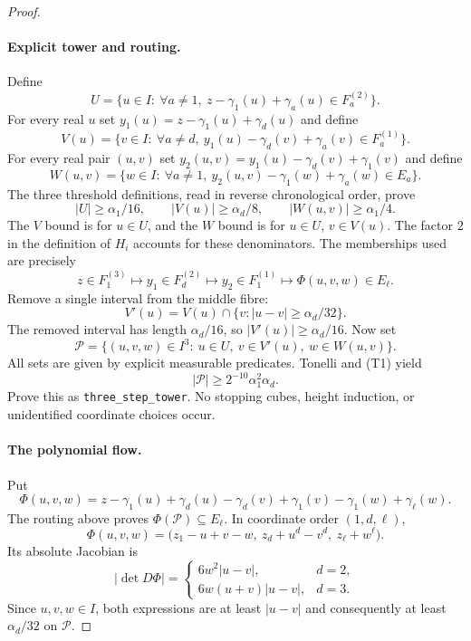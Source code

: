 \documentclass[11pt]{article}
\begin{document}
\begin{proof}
\paragraph{Explicit tower and routing.}
Define
\[
 U=\{u\in I:\ \forall a\ne1,\
       z-\gamma_1(u)+\gamma_a(u)\in F^{(2)}_a\}.
\]
For every real $u$ set $y_1(u)=z-\gamma_1(u)+\gamma_d(u)$ and define
\[
 V(u)=\{v\in I:\ \forall a\ne d,\
       y_1(u)-\gamma_d(v)+\gamma_a(v)\in F^{(1)}_a\}.
\]
For every real pair $(u,v)$ set $y_2(u,v)=y_1(u)-\gamma_d(v)+\gamma_1(v)$ and define
\[
 W(u,v)=\{w\in I:\ \forall a\ne1,\
       y_2(u,v)-\gamma_1(w)+\gamma_a(w)\in E_a\}.
\]
The three threshold definitions, read in reverse chronological order,
prove
\[
 |U|\geq\alpha_1/16,\qquad
 |V(u)|\geq\alpha_d/8,\qquad
 |W(u,v)|\geq\alpha_1/4.                            \tag{T1}
\]
The $V$ bound is for $u\in U$, and the $W$ bound is for $u\in U$, $v\in V(u)$. The factor $2$ in the definition of $H_i$ accounts for these denominators.
The memberships used are precisely
\[
 z\in F^{(3)}_1
 \longmapsto y_1\in F^{(2)}_d
 \longmapsto y_2\in F^{(1)}_1
 \longmapsto \Phi(u,v,w)\in E_\ell.
\]
Remove a single interval from the middle fibre:
\[
 V'(u)=V(u)\cap\{v:|u-v|\geq\alpha_d/32\}.
\]
The removed interval has length $\alpha_d/16$, so $|V'(u)|\geq\alpha_d/16$.
Now set
\[
 \mathcal P=\{(u,v,w)\in I^3:\ u\in U,\ v\in V'(u),\ w\in W(u,v)\}.
\]
All sets are given by explicit measurable predicates. Tonelli and (T1)
yield
\[
 |\mathcal P|\geq 2^{-10}\alpha_1^2\alpha_d.         \tag{T2}
\]
Prove this as \texttt{three\_step\_tower}. No stopping cubes, height
induction, or unidentified coordinate choices occur.

\paragraph{The polynomial flow.}
Put
\[
 \Phi(u,v,w)=z-\gamma_1(u)+\gamma_d(u)
                -\gamma_d(v)+\gamma_1(v)
                -\gamma_1(w)+\gamma_\ell(w).
\]
The routing above proves $\Phi(\mathcal P)\subseteq E_\ell$. In coordinate
order $(1,d,\ell)$,
\[
 \Phi(u,v,w)
 =\bigl(z_1-u+v-w,\ z_d+u^d-v^d,\ z_\ell+w^\ell\bigr).
\]
Its absolute Jacobian is
\[
 |\det D\Phi|=
 \begin{cases}
  6w^2|u-v|,&d=2,\\
  6w(u+v)|u-v|,&d=3.
 \end{cases}                                                    \tag{J1}
\]
Since $u,v,w\in I$, both expressions are at least $|u-v|$ and consequently
at least $\alpha_d/32$ on $\mathcal P$.


\end{proof}
\end{document}
